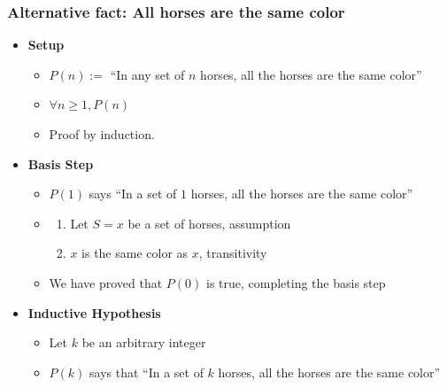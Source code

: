 \begin{frame}
  \frametitle{Alternative fact: All horses are the same color}

  \begin{itemize}
    
  \item \textbf{Setup}
    \begin{itemize}
    \item $P(n) := $ ``In any set of $n$ horses, all the horses are the same color''
    \item $\forall n \geq 1, P(n)$ 
    \item Proof by induction.
    \end{itemize}
    \pause

  \item \textbf{Basis Step}
    \begin{itemize}
    \item $P(1)$ says ``In a set of $1$ horses, all the horses are the same color''
    \item
      \begin{enumerate}
      \item Let $S = {x}$ be a set of horses, assumption
      \item $x$ is the same color as $x$, transitivity
      \end{enumerate}
    \item We have proved that $P(0)$ is true, completing the basis step
    \end{itemize}
    \pause

  \item \textbf{Inductive Hypothesis}
    \begin{itemize}
    \item Let $k$ be an arbitrary integer
    \item $P(k)$ says that ``In a set of $k$ horses, all the horses are the same color''
    \end{itemize}
  \end{itemize}
\end{frame}

